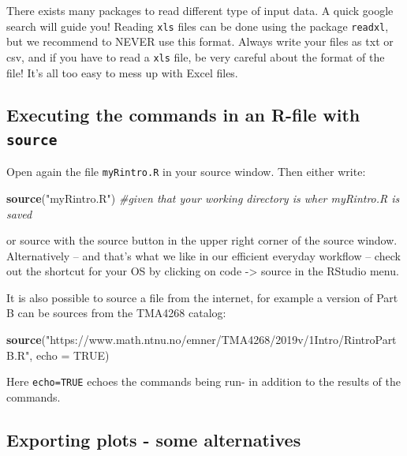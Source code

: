 \documentclass[]{article}
\newenvironment{Shaded}{\begin{snugshade}}{\end{snugshade}}
\newcommand{\KeywordTok}[1]{\textcolor[rgb]{0.13,0.29,0.53}{\textbf{#1}}}
\newcommand{\DataTypeTok}[1]{\textcolor[rgb]{0.13,0.29,0.53}{#1}}
\newcommand{\StringTok}[1]{\textcolor[rgb]{0.31,0.60,0.02}{#1}}
\newcommand{\CommentTok}[1]{\textcolor[rgb]{0.56,0.35,0.01}{\textit{#1}}}
\newcommand{\OtherTok}[1]{\textcolor[rgb]{0.56,0.35,0.01}{#1}}
\newcommand{\NormalTok}[1]{#1}
\begin{document}
There exists many packages to read different type of input data. A quick
google search will guide you! Reading \texttt{xls} files can be done
using the package \texttt{readxl}, but we recommend to NEVER use this
format. Always write your files as txt or csv, and if you have to read a
\texttt{xls} file, be very careful about the format of the file! It's
all too easy to mess up with Excel files.

\subsection{\texorpdfstring{Executing the commands in an R-file with
\texttt{source}}{Executing the commands in an R-file with source}}\label{executing-the-commands-in-an-r-file-with-source}

Open again the file \texttt{myRintro.R} in your source window. Then
either write:

\begin{Shaded}
\begin{Highlighting}[]
\KeywordTok{source}\NormalTok{(}\StringTok{"myRintro.R"}\NormalTok{)  }\CommentTok{#given that your working directory is wher myRintro.R is saved}
\end{Highlighting}
\end{Shaded}

or source with the source button in the upper right corner of the source
window. Alternatively -- and that's what we like in our efficient
everyday workflow -- check out the shortcut for your OS by clicking on
code -\textgreater{} source in the RStudio menu.

It is also possible to source a file from the internet, for example a
version of Part B can be sources from the TMA4268 catalog:

\begin{Shaded}
\begin{Highlighting}[]
\KeywordTok{source}\NormalTok{(}\StringTok{"https://www.math.ntnu.no/emner/TMA4268/2019v/1Intro/RintroPartB.R"}\NormalTok{, }
    \DataTypeTok{echo =} \OtherTok{TRUE}\NormalTok{)}
\end{Highlighting}
\end{Shaded}

Here \texttt{echo=TRUE} echoes the commands being run- in addition to
the results of the commands.

\subsection{Exporting plots - some
alternatives}\label{exporting-plots---some-alternatives}
\end{document}
